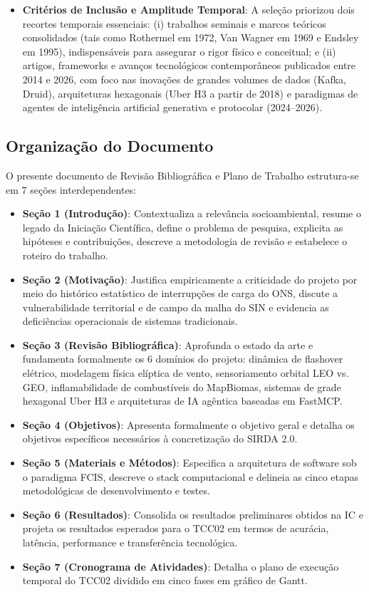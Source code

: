 \begin{itemize}
\begin{enumerate}
    \end{enumerate}
    \item \textbf{Critérios de Inclusão e Amplitude Temporal}: A seleção priorizou dois recortes temporais essenciais: (i) trabalhos seminais e marcos teóricos consolidados (tais como Rothermel em 1972, Van Wagner em 1969 e Endsley em 1995), indispensáveis para assegurar o rigor físico e conceitual; e (ii) artigos, frameworks e avanços tecnológicos contemporâneos publicados entre 2014 e 2026, com foco nas inovações de grandes volumes de dados (Kafka, Druid), arquiteturas hexagonais (Uber H3 a partir de 2018) e paradigmas de agentes de inteligência artificial generativa e protocolar (2024--2026).
\end{itemize}

\subsection{Organização do Documento}
\label{sbc:organizacao_documento}

O presente documento de Revisão Bibliográfica e Plano de Trabalho estrutura-se em 7 seções interdependentes:
\begin{itemize}
    \item \textbf{Seção 1 (Introdução)}: Contextualiza a relevância socioambiental, resume o legado da Iniciação Científica, define o problema de pesquisa, explicita as hipóteses e contribuições, descreve a metodologia de revisão e estabelece o roteiro do trabalho.
    \item \textbf{Seção 2 (Motivação)}: Justifica empiricamente a criticidade do projeto por meio do histórico estatístico de interrupções de carga do ONS, discute a vulnerabilidade territorial e de campo da malha do SIN e evidencia as deficiências operacionais de sistemas tradicionais.
    \item \textbf{Seção 3 (Revisão Bibliográfica)}: Aprofunda o estado da arte e fundamenta formalmente os 6 domínios do projeto: dinâmica de flashover elétrico, modelagem física elíptica de vento, sensoriamento orbital LEO vs. GEO, inflamabilidade de combustíveis do MapBiomas, sistemas de grade hexagonal Uber H3 e arquiteturas de IA agêntica baseadas em FastMCP.
    \item \textbf{Seção 4 (Objetivos)}: Apresenta formalmente o objetivo geral e detalha os objetivos específicos necessários à concretização do SIRDA 2.0.
    \item \textbf{Seção 5 (Materiais e Métodos)}: Especifica a arquitetura de software sob o paradigma FCIS, descreve o stack computacional e delineia as cinco etapas metodológicas de desenvolvimento e testes.
    \item \textbf{Seção 6 (Resultados)}: Consolida os resultados preliminares obtidos na IC e projeta os resultados esperados para o TCC02 em termos de acurácia, latência, performance e transferência tecnológica.
    \item \textbf{Seção 7 (Cronograma de Atividades)}: Detalha o plano de execução temporal do TCC02 dividido em cinco fases em gráfico de Gantt.
\end{itemize}
